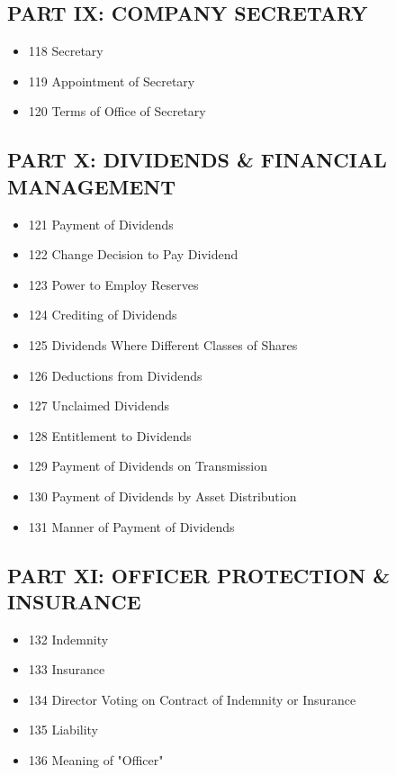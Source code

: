 \subsection*{PART IX: COMPANY SECRETARY}
\begin{itemize}[leftmargin=1em]
    \item 118 Secretary
    \item 119 Appointment of Secretary
    \item 120 Terms of Office of Secretary
\end{itemize}

\subsection*{PART X: DIVIDENDS \& FINANCIAL MANAGEMENT}
\begin{itemize}[leftmargin=1em]
    \item 121 Payment of Dividends
    \item 122 Change Decision to Pay Dividend
    \item 123 Power to Employ Reserves
    \item 124 Crediting of Dividends
    \item 125 Dividends Where Different Classes of Shares
    \item 126 Deductions from Dividends
    \item 127 Unclaimed Dividends
    \item 128 Entitlement to Dividends
    \item 129 Payment of Dividends on Transmission
    \item 130 Payment of Dividends by Asset Distribution
    \item 131 Manner of Payment of Dividends
\end{itemize}

\subsection*{PART XI: OFFICER PROTECTION \& INSURANCE}
\begin{itemize}[leftmargin=1em]
    \item 132 Indemnity
    \item 133 Insurance
    \item 134 Director Voting on Contract of Indemnity or Insurance
    \item 135 Liability
    \item 136 Meaning of "Officer"
\end{itemize}

